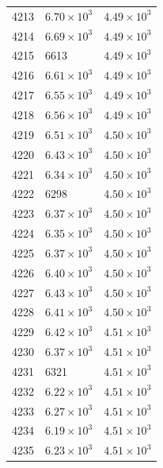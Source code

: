 \begin{table}[H]
\begin{tabular}{lll}
4213 & $\displaystyle 6.70 \times 10^{3}$ & $\displaystyle 4.49 \times 10^{3}$ \\
4214 & $\displaystyle 6.69 \times 10^{3}$ & $\displaystyle 4.49 \times 10^{3}$ \\
4215 & 6613 & $\displaystyle 4.49 \times 10^{3}$ \\
4216 & $\displaystyle 6.61 \times 10^{3}$ & $\displaystyle 4.49 \times 10^{3}$ \\
4217 & $\displaystyle 6.55 \times 10^{3}$ & $\displaystyle 4.49 \times 10^{3}$ \\
4218 & $\displaystyle 6.56 \times 10^{3}$ & $\displaystyle 4.49 \times 10^{3}$ \\
4219 & $\displaystyle 6.51 \times 10^{3}$ & $\displaystyle 4.50 \times 10^{3}$ \\
4220 & $\displaystyle 6.43 \times 10^{3}$ & $\displaystyle 4.50 \times 10^{3}$ \\
4221 & $\displaystyle 6.34 \times 10^{3}$ & $\displaystyle 4.50 \times 10^{3}$ \\
4222 & 6298 & $\displaystyle 4.50 \times 10^{3}$ \\
4223 & $\displaystyle 6.37 \times 10^{3}$ & $\displaystyle 4.50 \times 10^{3}$ \\
4224 & $\displaystyle 6.35 \times 10^{3}$ & $\displaystyle 4.50 \times 10^{3}$ \\
4225 & $\displaystyle 6.37 \times 10^{3}$ & $\displaystyle 4.50 \times 10^{3}$ \\
4226 & $\displaystyle 6.40 \times 10^{3}$ & $\displaystyle 4.50 \times 10^{3}$ \\
4227 & $\displaystyle 6.43 \times 10^{3}$ & $\displaystyle 4.50 \times 10^{3}$ \\
4228 & $\displaystyle 6.41 \times 10^{3}$ & $\displaystyle 4.50 \times 10^{3}$ \\
4229 & $\displaystyle 6.42 \times 10^{3}$ & $\displaystyle 4.51 \times 10^{3}$ \\
4230 & $\displaystyle 6.37 \times 10^{3}$ & $\displaystyle 4.51 \times 10^{3}$ \\
4231 & 6321 & $\displaystyle 4.51 \times 10^{3}$ \\
4232 & $\displaystyle 6.22 \times 10^{3}$ & $\displaystyle 4.51 \times 10^{3}$ \\
4233 & $\displaystyle 6.27 \times 10^{3}$ & $\displaystyle 4.51 \times 10^{3}$ \\
4234 & $\displaystyle 6.19 \times 10^{3}$ & $\displaystyle 4.51 \times 10^{3}$ \\
4235 & $\displaystyle 6.23 \times 10^{3}$ & $\displaystyle 4.51 \times 10^{3}$ \\

\end{tabular}
\end{table}
